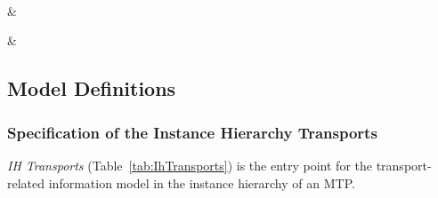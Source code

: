 \begin{footnotesize}
\begin{longtable}
		  \\ \hline
		
		\\ \hline
	
		\\ \hline
	
		     & 
		\\ \hline
	
		     & 
		\\ \hline
	
	\end{longtable}
\end{footnotesize}

\subsection{Model Definitions}
\label{subsec:AnhangTransportSetModelle}

\subsubsection{Specification of the Instance Hierarchy Transports}

\emph{IH Transports} (Table~\ref{tab:IhTransports}) is the entry point for the transport-related information model in the instance hierarchy of an MTP.

